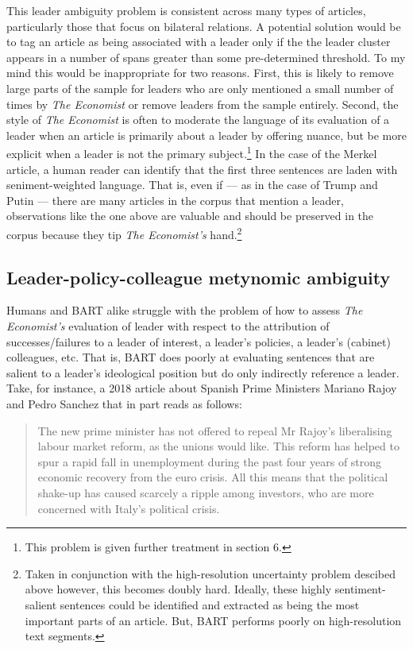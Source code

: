 \documentclass[11pt, letterpaper, twoside]{article}
\begin{document}
        This leader ambiguity problem is consistent across many types of articles, particularly those that focus on bilateral relations. A potential solution would be to tag an article as being associated with a leader only if the the leader cluster appears in a number of spans greater than some pre-determined threshold. To my mind this would be inappropriate for two reasons. First, this is likely to remove large parts of the sample for leaders who are only mentioned a small number of times by \textit{The Economist} or remove leaders from the sample entirely. Second, the style of \textit{The Economist} is often to moderate the language of its evaluation of a leader when an article is primarily about a leader by offering nuance, but be more explicit when a leader is not the primary subject.\footnote{This problem is given further treatment in section 6.} In the case of the Merkel article, a human reader can identify that the first three sentences are laden with seniment-weighted language. That is, even if --- as in the case of Trump and Putin --- there are many articles in the corpus that mention a leader, observations like the one above are valuable and should be preserved in the corpus because they tip \textit{The Economist's} hand.\footnote{Taken in conjunction with the high-resolution uncertainty problem descibed above however, this becomes doubly hard. Ideally, these highly sentiment-salient sentences could be identified and extracted as being the most important parts of an article. But, BART performs poorly on high-resolution text segments.}\\

    \subsection{Leader-policy-colleague metynomic ambiguity}
        Humans and BART alike struggle with the problem of how to assess \textit{The Economist's} evaluation of leader with respect to the attribution of successes/failures to a leader of interest, a leader's policies, a leader's (cabinet) colleagues, etc. That is, BART does poorly at evaluating sentences that are salient to a leader's ideological position but do only indirectly reference a leader.\\

        Take, for instance, a 2018 article about Spanish Prime Ministers Mariano Rajoy and Pedro Sanchez that in part reads as follows:

        \begin{quote}
            The new prime minister has not offered to repeal Mr Rajoy's liberalising labour market reform, as the unions would like. This reform has helped to spur a rapid fall in unemployment during the past four years of strong economic recovery from the euro crisis. All this means that the political shake-up has caused scarcely a ripple among investors, who are more concerned with Italy's political crisis.
        \end{quote}
\end{document}

